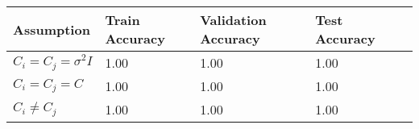 \def\arraystretch{1.25}
\begin{center}
\begin{longtable}{l l l l l}
\hline
\hline
\textbf{Assumption} & \textbf{Train Accuracy} & \textbf{Validation Accuracy} & \textbf{Test Accuracy}\\
\hline
\hline
$C_{i}=C_{j}=\sigma^{2}I$ & 1.00 & 1.00 & 1.00\\
$C_{i}=C_{j}=C$ & 1.00 & 1.00 & 1.00 \\
$C_{i}\neq C_{j}$ & 1.00 & 1.00 & 1.00 \\

\hline
\end{longtable}
\setcounter{table}{1}
\end{center}